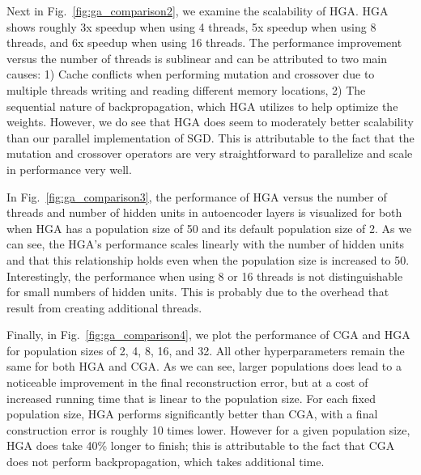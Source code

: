 Next in Fig.~\ref{fig:ga_comparison2}, we examine the scalability of HGA. HGA shows roughly 3x speedup when using 4 threads, 5x speedup when using 8 threads, and 6x speedup when using 16 threads. The performance improvement versus the number of threads is sublinear and can be attributed to two main causes: 1) Cache conflicts when performing mutation and crossover due to multiple threads writing and reading different memory locations, 2) The sequential nature of backpropagation, which HGA utilizes to help optimize the weights. However, we do see that HGA does seem to moderately better scalability than our parallel implementation of SGD. This is attributable to the fact that the mutation and crossover operators are very straightforward to parallelize and scale in performance very well. 

In Fig.~\ref{fig:ga_comparison3}, the performance of HGA versus the number of threads and number of hidden units in autoencoder layers is visualized for both when HGA has a population size of 50 and its default population size of 2. As we can see, the HGA's performance scales linearly with the number of hidden units and that this relationship holds even when the population size is increased to 50. Interestingly, the performance when using 8 or 16 threads is not distinguishable for small numbers of hidden units. This is probably due to the overhead that result from creating additional threads.

Finally, in Fig.~\ref{fig:ga_comparison4}, we plot the performance of CGA and HGA for population sizes of 2, 4, 8, 16, and 32. All other hyperparameters remain the same for both HGA and CGA. As we can see, larger populations does lead to a noticeable improvement in the final reconstruction error, but at a cost of increased running time that is linear to the population size. For each fixed population size, HGA performs significantly better than CGA, with a final construction error is roughly 10 times lower. However for a given population size, HGA does take 40\% longer to finish; this is attributable to the fact that CGA does not perform backpropagation, which takes additional time. 

\begin{figure*}[h]
  \centering
  \caption{Comparison of performance for CGA and HGA with population sizes of 2, 4, 8, 16, and 32. HGA performs significantly better than CGA in terms of final reconstruction}
  \label{fig:ga_comparison4}
\end{figure*}

\FloatBarrier
